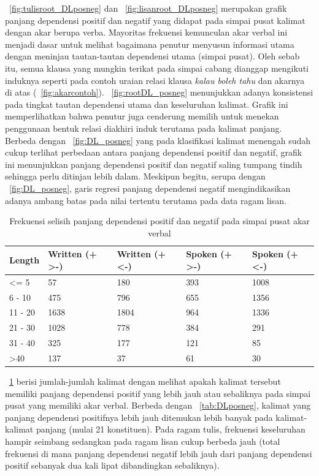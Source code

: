 \documentclass[10pt, a4paper, conference, compsocconf]{IEEEtran}
\begin{document}
\pic~\ref{fig:tulisroot_DLposneg} dan \pic~\ref{fig:lisanroot_DLposneg} merupakan grafik panjang dependensi positif dan negatif yang didapat pada simpai pusat kalimat dengan akar berupa verba. Mayoritas frekuensi kemunculan akar verbal ini menjadi dasar untuk melihat bagaimana penutur menyusun informasi utama dengan meninjau tautan-tautan dependensi utama (simpai pusat). Oleh sebab itu, semua klausa yang mungkin terikat pada simpai cabang dianggap mengikuti induknya seperti pada contoh uraian relasi klausa \textit{kalau boleh tahu} dan akarnya di atas (\pic~\ref{fig:akarcontoh}). \pic~\ref{fig:rootDL_posneg} menunjukkan adanya konsistensi pada tingkat tautan dependensi utama dan keseluruhan kalimat. Grafik ini memperlihatkan bahwa penutur juga cenderung memilih untuk menekan penggunaan bentuk relasi diakhiri induk terutama pada kalimat panjang. Berbeda dengan \pic~\ref{fig:DL_posneg} yang pada klasifikasi kalimat menengah sudah cukup terlihat perbedaan antara panjang dependensi positif dan negatif, grafik ini menunjukkan panjang dependensi positif dan negatif saling tumpang tindih sehingga perlu ditinjau lebih dalam. Meskipun begitu, serupa dengan \pic~\ref{fig:DL_posneg}, garis regresi panjang dependensi negatif mengindikasikan adanya ambang batas pada nilai tertentu terutama pada data ragam lisan.

\begin{table}
\begin{center}
\caption{Frekuensi selisih panjang dependensi positif dan negatif pada simpai pusat akar verbal}  \label{tab:DLpusatposneg}
\begin{tabular}{p{1.1cm} p{1.2cm} p{1.2cm} p{1.3cm} p{1.3cm}}
\hline
Length & Written (+ \textgreater -) & Written (+ \textless -) & Spoken (+ \textgreater -) & Spoken (+ \textless -) \\ \hline
\textless= 5 	& 57	 	& 180 	& 393 & 1008 \\
6 - 10 		& 475 	& 796	& 655 & 1356 \\ 
11 - 20 		& 1638	& 1804	& 964 & 1336 \\
21 - 30 		& 1028	& 778	& 384 & 291 \\
31 - 40 		& 325	& 177	& 121 & 85 \\
\textgreater 40 	& 137	& 37	 	& 61 & 30 \\ \hline
   \end{tabular}
\end{center}
\end{table}

\tab~\ref{tab:DLpusatposneg} berisi jumlah-jumlah kalimat dengan melihat apakah kalimat tersebut memiliki panjang dependensi positif yang lebih jauh atau sebaliknya pada simpai pusat yang memiliki akar verbal. Berbeda dengan \tab~\ref{tab:DLposneg}, kalimat yang panjang dependensi positifnya lebih jauh ditemukan lebih banyak pada kalimat-kalimat panjang (mulai 21 konstituen). Pada ragam tulis, frekuensi keseluruhan hampir seimbang sedangkan pada ragam lisan cukup berbeda jauh (total frekuensi di mana panjang dependensi negatif lebih jauh dari panjang dependensi positif sebanyak dua kali lipat dibandingkan sebaliknya). 
\end{document}
